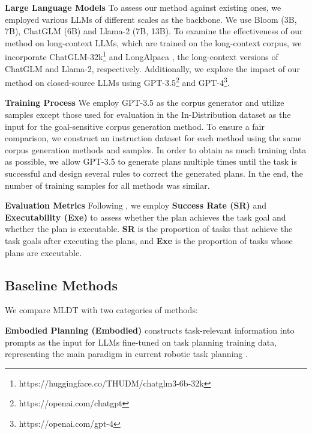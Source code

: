 \noindent \textbf{Large Language Models} To assess our method against existing ones, we employed various LLMs of different scales as the backbone. We use Bloom \cite{DBLP:journals/corr/abs-2211-05100} (3B, 7B), ChatGLM \cite{DBLP:conf/acl/DuQLDQY022} (6B) and Llama-2 \cite{DBLP:journals/corr/abs-2307-09288} (7B, 13B). To examine the effectiveness of our method on long-context LLMs, which are trained on the long-context corpus, we incorporate ChatGLM-32k\footnote{https://huggingface.co/THUDM/chatglm3-6b-32k} and LongAlpaca \cite{DBLP:journals/corr/abs-2309-12307}, the long-context versions of ChatGLM and Llama-2, respectively. Additionally, we explore the impact of our method on closed-source LLMs using GPT-3.5\footnote{https://openai.com/chatgpt} and GPT-4\footnote{https://openai.com/gpt-4}.

\noindent \textbf{Training Process} We employ GPT-3.5 as the corpus generator and utilize samples except those used for evaluation in the In-Distribution dataset as the input for the goal-sensitive corpus generation method. To ensure a fair comparison, we construct an instruction dataset for each method using the same corpus generation methods and samples. In order to obtain as much training data as possible, we allow GPT-3.5 to generate plans multiple times until the task is successful and design several rules to correct the generated plans. In the end, the number of training samples for all methods was similar.

\noindent \textbf{Evaluation Metrics} Following \cite{DBLP:conf/icra/SinghBMGXTFTG23,DBLP:conf/icira/ZhangLHZQZLTMSZ23}, we employ \textbf{Success Rate (SR)} and \textbf{Executability (Exe)} to assess whether the plan achieves the task goal and whether the plan is executable. \textbf{SR} is the proportion of tasks that achieve the task goals after executing the plans, and \textbf{Exe} is the proportion of tasks whose plans are executable.

\subsection{Baseline Methods}

We compare MLDT with two categories of methods: 

\textbf{Embodied Planning (Embodied)} constructs task-relevant information into prompts as the input for LLMs fine-tuned on task planning training data, representing the main paradigm in current robotic task planning \cite{DBLP:journals/corr/abs-2305-10626,DBLP:journals/corr/abs-2307-01848,chalvatzaki2023learning}.

